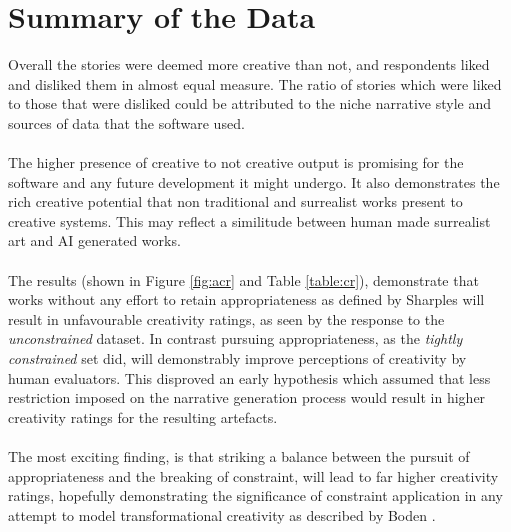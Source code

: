 \documentclass[letterpaper]{article}
\begin{document}
\section{Summary of the Data}
Overall the stories were deemed more creative than not, and respondents liked and disliked them in almost equal measure. The ratio of stories which were liked to those that were disliked could be attributed to the niche narrative style and sources of data that the software used.\\
\\The higher presence of creative to not creative output is promising for the software and any future development it might undergo. It also demonstrates the rich creative potential that non traditional and surrealist works present to creative systems. This may reflect a similitude between human made surrealist art and AI generated works.\\ 
\\The results (shown in Figure \ref{fig:acr} and Table \ref{table:cr}), demonstrate that works without any effort to retain appropriateness as defined by Sharples \cite{Sharples96anaccount} will result in unfavourable creativity ratings, as seen by the response to the \emph{unconstrained} dataset. In contrast pursuing appropriateness, as the \emph{tightly constrained} set did, will demonstrably improve perceptions of creativity by human evaluators. This disproved an early hypothesis which assumed that less restriction imposed on the narrative generation process would result in higher creativity ratings for the resulting artefacts.\\ 
\\The most exciting finding, is that striking a balance between the pursuit of appropriateness and the breaking of constraint, will lead to far higher creativity ratings, hopefully demonstrating the significance of constraint application in any attempt to model transformational creativity as described by Boden \cite{BODEN1998347}.
\end{document}
